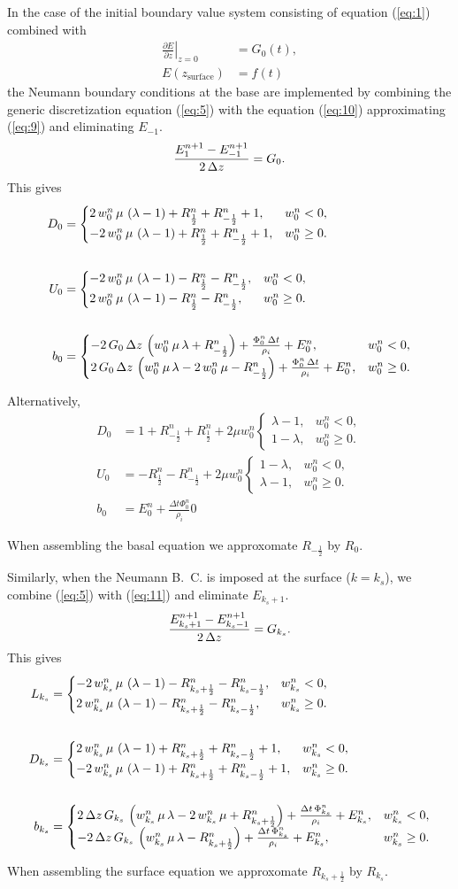 \documentclass{article}
\newcommand{\wcase}[3]{\begin{cases} #1, & w^{n}_{#3} < 0,\\#2, & w^{n}_{#3} \ge 0.\end{cases}}
\newcommand{\wcaseeq}[4]{#1 &= \wcase{#2}{#3}{#4}}
\begin{document}
In the case of the initial boundary value system consisting of
equation (\ref{eq:1}) combined with
\begin{align}
  \label{eq:9}
  \left.\frac{\partial E}{\partial z}\right|_{z = 0} &= G_{0}(t),\\
  E(z_{\text{surface}}) &= f(t)
\end{align}
the Neumann boundary conditions at the base are implemented by
combining the generic discretization equation (\ref{eq:5}) with the
equation (\ref{eq:10}) approximating (\ref{eq:9}) and eliminating
$E_{-1}$.
\begin{equation}
  \label{eq:10}
  \frac{E^{n+1}_{1}-E^{n+1}_{-1}}{2\,\Delta z}=G_{0}.
\end{equation}
This gives
\begin{align}
  \wcaseeq{D_{0}}{\Dmb}{\Dpb}{0}\\
  \notag\\
  \wcaseeq{U_{0}}{\Umb}{\Upb}{0}\\
  \notag\\
  \wcaseeq{b_{0}}{\Bmb}{\Bpb}{0}
\end{align}

\renewcommand{\Rp}{R^{n}_{\frac{1}{2}}}
\renewcommand{\Rm}{R^{n}_{-\frac{1}{2}}}
\renewcommand{\W}{w^{n}_{0}}

Alternatively,
\begin{align}
  D_{0} &= 1 + \Rm + \Rp + 2\mu\W \wcase{\lambda - 1}{1 - \lambda}{0}\\
  U_{0} &= -\Rp -\Rm + 2\mu\W \wcase{1 - \lambda}{\lambda - 1}{0}\\
  b_{0} &= E^{n}_{0} + \frac{\Delta t \Phi^{n}_{0}}{\rho_{i}}{0}
\end{align}

When assembling the basal equation we approxomate $R_{-\frac{1}{2}}$ by $R_{0}$.

\newcommand{\ks}{k_{s}}

Similarly, when the Neumann B.~C. is imposed at the surface ($k =
\ks$), we combine (\ref{eq:5}) with (\ref{eq:11}) and eliminate $E_{\ks+1}$.
\begin{equation}
  \label{eq:11}
  \frac{E^{n+1}_{k_{s}+1}-E^{n+1}_{k_{s}-1}}{2\,\Delta z}=G_{k_{s}}.
\end{equation}
This gives
\begin{align}
  \wcaseeq{L_{\ks}}{\Lms}{\Lps}{\ks}\\
  \notag\\
  \wcaseeq{D_{\ks}}{\Dms}{\Dps}{\ks}\\
  \notag\\
  \wcaseeq{b_{\ks}}{\Bms}{\Bps}{\ks}
\end{align}

When assembling the surface equation we approxomate $R_{\ks + \frac{1}{2}}$ by $R_{\ks}$.
\end{document}
